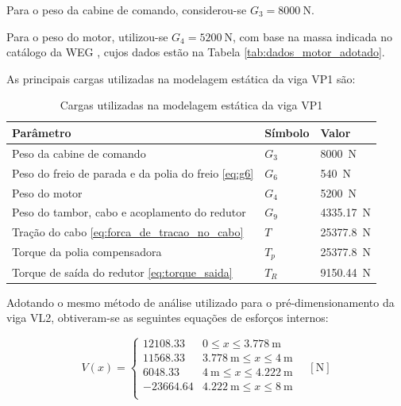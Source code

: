 Para o peso da cabine de comando, considerou-se $G_3 = \SI{8000}{\newton}$.

Para o peso do motor, utilizou-se $G_4 = \SI{5200}{\newton}$, com base na massa indicada no catálogo da WEG \cite{weg}, cujos dados estão na Tabela \ref{tab:dados_motor_adotado}.

As principais cargas utilizadas na modelagem estática da viga VP1 são:

\begin{table}[H]
  \centering
  \caption{Cargas utilizadas na modelagem estática da viga VP1}
  \label{tab:cargas_vp1}
  \begin{tabularx}{\textwidth}{>{\centering\arraybackslash}X>{\centering\arraybackslash}X>{\centering\arraybackslash}X}
    \toprule
    Parâmetro                                                 & Símbolo & Valor                 \\
    \midrule
    Peso da cabine de comando                                 & $G_3$   & \SI{8000}{\newton}    \\
    Peso do freio de parada e da polia do freio \eqref{eq:g6} & $G_6$   & \SI{540}{\newton}     \\
    Peso do motor                                             & $G_4$   & \SI{5200}{\newton}    \\
    Peso do tambor, cabo e acoplamento do redutor             & $G_9$   & \SI{4335.17}{\newton} \\
    Tração do cabo \eqref{eq:forca_de_tracao_no_cabo}         & $T$     & \SI{25377.8}{\newton} \\
    Torque da polia compensadora                              & $T_p$   & \SI{25377.8}{\newton} \\
    Torque de saída do redutor \eqref{eq:torque_saida}        & $T_R$   & \SI{9150.44}{\newton} \\
    \bottomrule
  \end{tabularx}
\end{table}

Adotando o mesmo método de análise utilizado para o pré-dimensionamento da viga VL2, obtiveram-se as seguintes equações de esforços internos:

\[
  V(x) =
  \begin{cases}
    \num{12108.33}  & 0 \leq x \leq \SI{3.778}{\meter}              \\
    \num{11568.33}  & \SI{3.778}{\meter} \leq x \leq \SI{4}{\meter} \\
    \num{6048.33}   & \SI{4}{\meter} \leq x \leq \SI{4.222}{\meter} \\
    -\num{23664.64} & \SI{4.222}{\meter} \leq x \leq \SI{8}{\meter} \\
  \end{cases}
  \quad \left[ \si{\newton} \right]
\]

